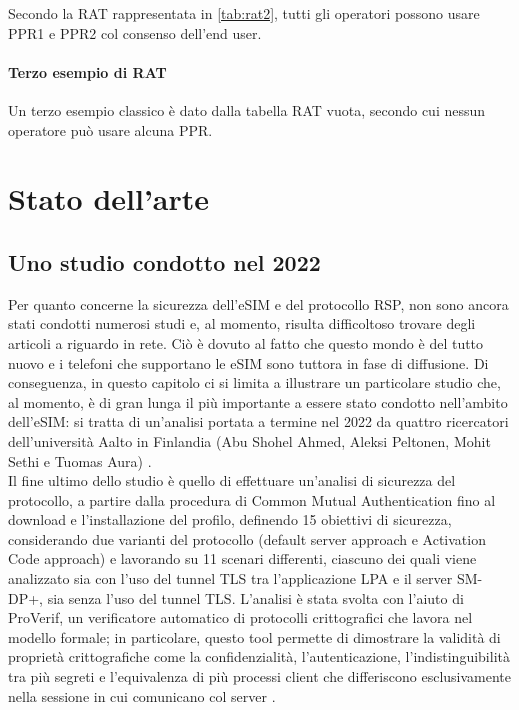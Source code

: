 \documentclass[10pt, oneside]{book}
\begin{document}
Secondo la RAT rappresentata in \ref{tab:rat2}, tutti gli operatori possono usare PPR1 e PPR2 col consenso dell'end user.

\subsubsection{Terzo esempio di RAT}
Un terzo esempio classico è dato dalla tabella RAT vuota, secondo cui nessun operatore può usare alcuna PPR.

\chapter{Stato dell'arte}
\section{Uno studio condotto nel 2022}
Per quanto concerne la sicurezza dell'eSIM e del protocollo RSP, non sono ancora stati condotti numerosi studi e, al momento, risulta difficoltoso trovare degli articoli a riguardo in rete. Ciò è dovuto al fatto che questo mondo è del tutto nuovo e i telefoni che supportano le eSIM sono tuttora in fase di diffusione. Di conseguenza, in questo capitolo ci si limita a illustrare un particolare studio che, al momento, è di gran lunga il più importante a essere stato condotto nell'ambito dell'eSIM: si tratta di un'analisi portata a termine nel 2022 da quattro ricercatori dell'università Aalto in Finlandia (Abu Shohel Ahmed, Aleksi Peltonen, Mohit Sethi e Tuomas Aura) \cite{Sec-analysis}.\\
Il fine ultimo dello studio è quello di effettuare un'analisi di sicurezza del protocollo, a partire dalla procedura di Common Mutual Authentication fino al download e l'installazione del profilo, definendo 15 obiettivi di sicurezza, considerando due varianti del protocollo (default server approach e Activation Code approach) e lavorando su 11 scenari differenti, ciascuno dei quali viene analizzato sia con l'uso del tunnel TLS tra l'applicazione LPA e il server SM-DP+, sia senza l'uso del tunnel TLS. L'analisi è stata svolta con l'aiuto di ProVerif, un verificatore automatico di protocolli crittografici che lavora nel modello formale; in particolare, questo tool permette di dimostrare la validità di proprietà crittografiche come la confidenzialità, l'autenticazione, l'indistinguibilità tra più segreti e l'equivalenza di più processi client che differiscono esclusivamente nella sessione in cui comunicano col server \cite{ProVerif}.\\
\end{document}
